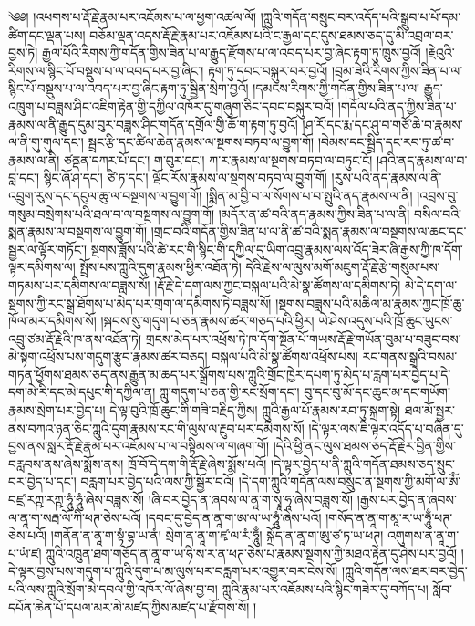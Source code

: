 \setcounter{footnote}{0} 
༄༅། །འཕགས་པ་རྡོ་རྗེ་རྣམ་པར་འཇོམས་པ་ལ་ཕྱག་འཚལ་ལོ། །ཀླུའི་གདོན་བསྲུང་བར་འདོད་པའི་སྒྲུབ་པ་པོ་དམ་ཚིག་དང་ལྡན་པས། བཅོམ་ལྡན་འདས་རྡོ་རྗེ་རྣམ་པར་འཇོམས་པའི་ང་རྒྱལ་དང་དུས་ཐམས་ཅད་དུ་མི་འབྲལ་བར་བྱས་ཏེ། རྒྱལ་པོའི་རིགས་ཀྱི་གདོན་གྱིས་ཟིན་པ་ལ་རྒྱུད་རྫོགས་པ་ལ་འབད་པར་བྱ་ཞིང་རྟག་ཏུ་ཁྲུས་བྱའོ། །རྗེའུའི་རིགས་ལ་སྙིང་པོ་བསྡུས་པ་ལ་འབད་པར་བྱ་ཞིང་། རྟག་ཏུ་དབང་བསྐུར་བར་བྱའོ། །བྲམ་ཟེའི་རིགས་ཀྱིས་ཟིན་པ་ལ་སྙིང་པོ་བསྡུས་པ་ལ་འབད་པར་བྱ་ཞིང་རྟག་ཏུ་སྦྱིན་སྲེག་བྱའོ། །དམངས་རིགས་ཀྱི་གདོན་གྱིས་ཟིན་པ་ལ། རྒྱུད་འཁྲུག་པ་བཟླས་ཤིང་འཇིག་རྟེན་གྱི་དཀྱིལ་འཁོར་དུ་གཞུག་ཅིང་དབང་བསྐུར་བའོ། །གདོལ་པའི་ནད་ཀྱིས་ཟིན་པ་རྣམས་ལ་ནི་རྒྱུད་དུམ་བུར་བཟླས་ཤིང་གདོན་དགྲོལ་གྱི་ཆོ་ག་རྟག་ཏུ་བྱའོ། །ཤ་རོ་དང་རྨ་དང་ཤུ་བ་གཙོ་ཆེ་བ་རྣམས་ལ་ནི་གུ་གུལ་དང་། སྦྲང་རྩི་དང་ཚིལ་ཆེན་རྣམས་ལ་སྔགས་བཏབ་ལ་བྱུག་གོ། །བེམས་དང་སྦྲིད་དང་རབ་ཏུ་ཚ་བ་རྣམས་ལ་ནི། ཙནྡན་དཀར་པོ་དང་། ག་བུར་དང་། ཀ་ར་རྣམས་ལ་སྔགས་བཏབ་ལ་བཏུང་ངོ། །ཤའི་ནད་རྣམས་ལ་བ་བླ་དང་། སྙིང་ཞོ་ཤ་དང་། ཙི་ཏ་དང་། ལྡོང་རོས་རྣམས་ལ་སྔགས་བཏབ་ལ་བྱུག་གོ། །རུས་པའི་ནད་རྣམས་ལ་ནི་འབྲུག་རུས་དང་དངུལ་ཆུ་ལ་བསྔགས་ལ་བྱུག་གོ། །སྨིན་མ་བྱི་བ་ལ་སོགས་པ་བ་སྤུའི་ནད་རྣམས་ལ་ནི། །འབྲས་བུ་གསུམ་བསྲེགས་པའི་ཐལ་བ་ལ་བསྔགས་ལ་བྱུག་གོ། །མདོར་ན་ཚ་བའི་ནད་རྣམས་ཀྱིས་ཟིན་པ་ལ་ནི། བསིལ་བའི་སྨན་རྣམས་ལ་བསྔགས་ལ་བྱུག་གོ། །གྲང་བའི་གདོན་གྱིས་ཟིན་པ་ལ་ནི་ཚ་བའི་སྨན་རྣམས་ལ་བསྔགས་ལ་ཆང་དང་སྦྱར་ལ་ལྟོར་གཏོང་། སྔགས་ཟློས་པའི་ཚེ་རང་གི་སྙིང་གི་དཀྱིལ་དུ་ཡིག་འབྲུ་རྣམས་ལས་འོད་ཟེར་ཞི་རྒྱས་ཀྱི་ཁ་དོག་ལྟར་དམིགས་ལ། སྤྲོས་པས་ཀླུའི་དུག་རྣམས་ཕྱིར་འཐོན་ཏེ། དེའི་རྗེས་ལ་ལུས་མགོ་མཇུག་རྡོ་རྗེ་རྩེ་གསུམ་པས་གཏམས་པར་དམིགས་ལ་བཟླས་སོ། །རྡོ་རྗེ་དེ་དག་ལས་ཀྱང་བསྐལ་པའི་མེ་སྣ་ཚོགས་ལ་དམིགས་ཏེ། མེ་དེ་དག་ལ་སྔགས་ཀྱི་རང་སྒྲ་ཐོགས་པ་མེད་པར་གྲག་ལ་དམིགས་ཏེ་བཟླས་སོ། །སྔགས་བཟླས་པའི་མཆིལ་མ་རྣམས་ཀྱང་ཁྲོ་ཆུ་ཁོལ་མར་དམིགས་སོ། །སྐབས་སུ་གདུག་པ་ཅན་རྣམས་ཚར་གཅད་པའི་ཕྱིར། ཡེ་ཤེས་འདུས་པའི་ཁྲོ་ཆུང་ཡུངས་འབྲུ་ཙམ་རྡོ་རྗེའི་ཁ་ནས་འཐོན་ཏེ། གྲངས་མེད་པར་འཕྲོས་ཏེ་ཁ་དོག་སྔོན་པོ་གཡས་རྡོ་རྗེ་གཡོན་བུམ་པ་བཟུང་བས་མེ་སྟག་འཕྲོས་པས་གདུག་རྩུབ་རྣམས་ཚར་བཅད། བསྐལ་པའི་མེ་སྣ་ཚོགས་འཕྲོས་པས། རང་གནས་སྒྲའི་བསམ་གཏན་ཕྱོགས་ཐམས་ཅད་ནས་རྒྱུན་མ་ཆད་པར་སྒྲོགས་པས་ཀླུའི་གྲོང་ཁྱེར་དཔག་ཏུ་མེད་པ་རླག་པར་བྱེད་པ་དེ་དག་མེ་རི་དང་མེ་དཔུང་གི་དཀྱིལ་ན། ཀླུ་གདུག་པ་ཅན་གྱི་རང་སྲོག་དང་། བུ་དང་བུ་མོ་དང་ཆུང་མ་དང་གཡོག་རྣམས་སྲེག་པར་བྱེད་པ། དེ་ལྟ་བུའི་ཁྲོ་ཆུང་གི་གཟི་བརྗིད་ཀྱིས། ཀླུའི་རྒྱལ་པོ་རྣམས་རབ་ཏུ་སྐྲག་སྟེ། ཐལ་མོ་སྦྱར་ནས་བཀའ་ཉན་ཅིང་ཀླུའི་དུག་རྣམས་རང་གི་ལུས་ལ་རྔུབ་པར་དམིགས་སོ། །དེ་ལྟར་ལས་ཇི་ལྟར་འདོད་པ་བཞིན་དུ་བྱས་ནས་སླར་རྡོ་རྗེ་རྣམ་པར་འཇོམས་པ་ལ་བསྟིམས་ལ་གཞག་གོ། །དེའི་ཕྱི་ནང་ལུས་ཐམས་ཅད་རྡོ་རྗེར་བྱིན་གྱིས་བརླབས་ནས་ཞེས་སྨོས་ནས། ཁྲོ་བོ་དེ་དག་གི་རྡོ་རྗེ་ཞེས་སྨོས་པའོ། །དེ་ལྟར་བྱེད་པ་ནི་ཀླུའི་གདོན་ཐམས་ཅད་སྲུང་བར་བྱེད་པ་དང་། བརླག་པར་བྱེད་པའི་ལས་ཀྱི་སྦྱོར་བའོ། །དེ་དག་ཀླུའི་གདོན་ལས་བསྲུང་ན་སྔགས་ཀྱི་མགོ་ལ་ཨོཾ་བཛྲ་རཀྵ་རཀྵ་ཧཱུཾ་ཧཱུཾ་ཞེས་བཟླས་སོ། །ཞི་བར་བྱེད་ན་ཞབས་ལ་ནཱ་ག་སྭཱ་ཧཱ་ཞེས་བཟླས་སོ། །རྒྱས་པར་བྱེད་ན་ཞབས་ལ་ནཱ་ག་སརྦ་ལོ་ཀི་ཕཊ་ཅེས་པའོ། །དབང་དུ་བྱེད་ན་ནཱ་ག་ཨ་ལ་ཡ་ཧཱུཾ་ཞེས་པའོ། །གསོད་ན་ནཱ་ག་མཱ་ར་ཡ་ཧཱུྃ་ཕཊ་ཅེས་པའོ། །གནོན་ན་ནཱ་ག་སྟཾ་བྷ་ཡ་ནཾ། སྲེག་ན་ནཱ་ག་ཛྭ་ལ་རཾ་ཧཱུྃ། སྐྲོད་ན་ནཱ་ག་ཨུ་ཙ་ཏ་ཡ་ཕཊ། འགུགས་ན་ནཱ་ག་པ་ཡཾ་ཛ། ཀླུའི་འཁྲུན་ཐག་གཅོད་ན་ནཱ་ག་ཡ་ཧི་ས་ར་ན་ཕཊ་ཅེས་པ་རྣམས་སྔགས་ཀྱི་མཐའ་རྟེན་དུ་ཤེས་པར་བྱའོ། །དེ་ལྟར་བྱས་པས་གདུག་པ་ཀླུའི་དུག་པ་མ་ལུས་པར་བརླག་པར་འགྱུར་བར་ངེས་སོ། །ཀླུའི་གདོན་ལས་ཐར་བར་བྱེད་པའི་ལས་ཀླུའི་སྲོག་མེ་དབལ་གྱི་འཁོར་ལོ་ཞེས་བྱ་བ། ཀླུའི་རྣམ་པར་འཇོམས་པའི་སྙིང་གཟེར་དུ་བཀོད་པ། སློབ་དཔོན་ཆེན་པོ་དཔལ་མར་མེ་མཛད་ཀྱིས་མཛད་པ་རྫོགས་སོ། །